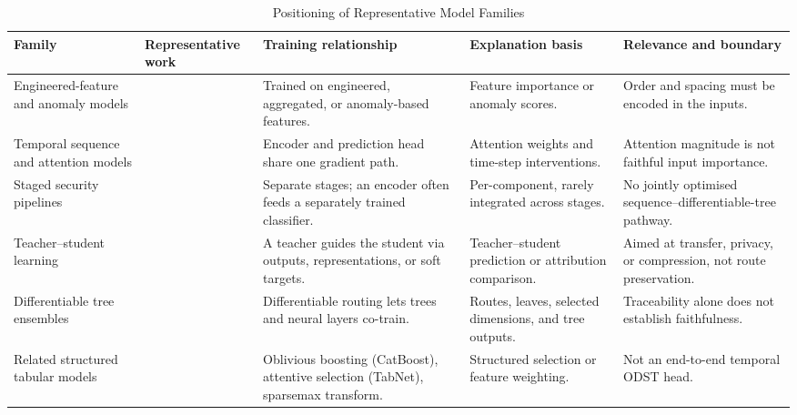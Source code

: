 \begin{table}[!t]
\caption{Positioning of Representative Model Families}
\label{tab:related_work_positioning}
\centering
\footnotesize
\renewcommand{\arraystretch}{1.15}
\setlength{\tabcolsep}{4pt}
\begin{tabularx}{\textwidth}
{@{}>{\raggedright\arraybackslash}p{2.35cm}
>{\raggedright\arraybackslash}p{2.70cm}
Y
Y
Y@{}}
\hline
\textbf{Family} &
\textbf{Representative work} &
\textbf{Training relationship} &
\textbf{Explanation basis} &
\textbf{Relevance and boundary} \\
\hline
Engineered-feature and anomaly models &
\cite{Grinsztajn2022,AlMhiqani2022,Jaiswal2024,LeZincirHeywood2021} &
Trained on engineered, aggregated, or anomaly-based features. &
Feature importance or anomaly scores. &
Order and spacing must be encoded in the inputs. \\
Temporal sequence and attention models &
\cite{YuanWu2021,Song2024,Pal2023,JainWallace2019Attention,
SerranoSmith2019Attention,WiegreffePinter2019Attention} &
Encoder and prediction head share one gradient path. &
Attention weights and time-step interventions. &
Attention magnitude is not faithful input importance. \\
Staged security pipelines &
\cite{He2024,Gayathri2024,Ketepalli2022LSTMAE} &
Separate stages; an encoder often feeds a separately trained classifier. &
Per-component, rarely integrated across stages. &
No jointly optimised sequence--differentiable-tree pathway. \\
Teacher--student learning &
\cite{Hinton2015Distillation,Gou2021KDSurvey,Furlanello2018BornAgain,
Shafee2020Mimic,Hsu2023TeacherStudent,Umair2025KDIDS} &
A teacher guides the student via outputs, representations, or soft targets. &
Teacher--student prediction or attribution comparison. &
Aimed at transfer, privacy, or compression, not route preservation. \\
Differentiable tree ensembles &
\cite{Kontschieder2015,popov2020node,Marton2024GRANDE} &
Differentiable routing lets trees and neural layers co-train. &
Routes, leaves, selected dimensions, and tree outputs. &
Traceability alone does not establish faithfulness. \\
Related structured tabular models &
\cite{Prokhorenkova2018CatBoost,ArikPfister2021TabNet,martins2016sparsemax} &
Oblivious boosting (CatBoost), attentive selection (TabNet), sparsemax
transform. &
Structured selection or feature weighting. &
Not an end-to-end temporal ODST head. \\
\hline
\end{tabularx}
\end{table}


